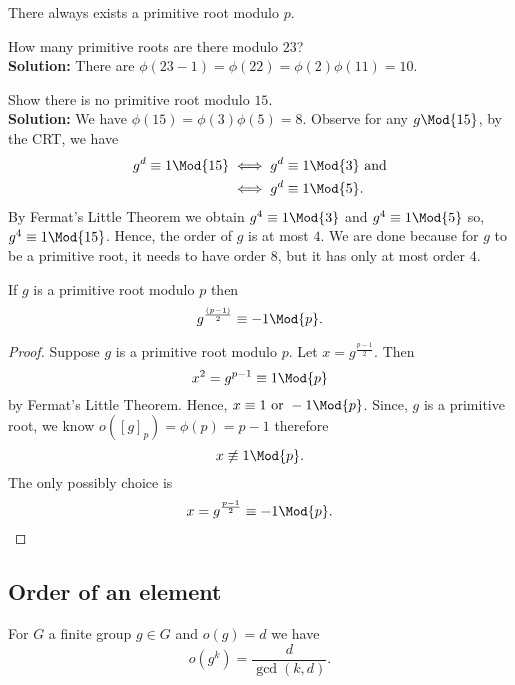 \documentclass[12pt, a4paper]{article}
\begin{document}
\begin{mdcor}
    There always exists a primitive root modulo \(p\).
\end{mdcor}

\begin{example}
    How many primitive roots are there modulo \(23\)? \\
    \textbf{Solution:} There are \(\phi(23-1)=\phi(22)=\phi(2)\phi(11)=10\).
\end{example}

\begin{mdexample}
    Show there is no primitive root modulo \(15\). \\
    \textbf{Solution:} We have \(\phi(15)=\phi(3)\phi(5)=8\). Observe for any \(g\Mod{15}\), by the CRT, we have 
    \[\begin{aligned}
        g^d \equiv 1 \Mod{15} \iff g^d &\equiv 1 \Mod{3} \text{ and}\\
                            \iff g^d &\equiv 1 \Mod{5}.
    \end{aligned}\]
    By Fermat's Little Theorem we obtain \(g^4 \equiv1 \Mod{3}\) and \(g^4 \equiv 1 \Mod{5}\) so, \(g^4 \equiv 1 \Mod{15}\). Hence, the order of \(g\) is at most \(4\). We are done because for \(g\) to be a primitive root, it needs to have order \(8\), but it has only at most order \(4\).
\end{mdexample}

\begin{mdprop}
    If \(g\) is a primitive root modulo \(p\) then
    \[g^{\frac{(p-1)}{2}} \equiv -1 \Mod{p}.\]
\end{mdprop}

\begin{proof}
    Suppose \(g\) is a primitive root modulo \(p\). Let \(x = g^{\frac{p-1}{2}}\). Then 
    \[x^2 = g^{p-1} \equiv 1 \Mod{p}\]
    by Fermat's Little Theorem. Hence, \(x\equiv 1 \text{ or } -1 \Mod{p}\). Since, \(g\) is a primitive root, we know \(o([g]_p)=\phi(p)=p-1\) therefore 
    \[x \not\equiv 1 \Mod{p}.\]
    The only possibly choice is
    \[x = g^{\frac{p-1}{2}} \equiv -1 \Mod{p}.\]
\end{proof}

\subsection{Order of an element}

\begin{mdprop}
    For \(G\) a finite group \(g\in G\) and \(o(g)=d\) we have 
    \[o(g^k) = \frac{d}{\gcd(k,d)}.\]
\end{mdprop}
\end{document}
